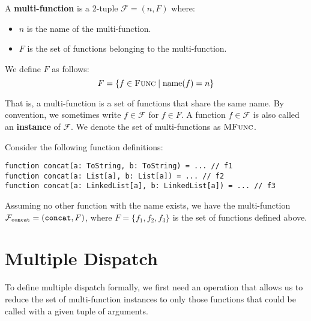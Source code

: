 \noindent A \textbf{multi-function} is a 2-tuple $\mathcal{F} = (n, F)$ where:
\begin{itemize}
	\item $n$ is the name of the multi-function.
	\item $F$ is the set of functions belonging to the multi-function.
\end{itemize}

\noindent We define $F$ as follows:
\begin{equation*}
	F = \{ f \in \textsc{Func} \mid \operatorname{name}(f) = n \}
\end{equation*}

\noindent That is, a multi-function is a set of functions that share the same name. By convention, we sometimes write $f \in \mathcal{F}$ for $f \in F$. A function $f \in \mathcal{F}$ is also called an \textbf{instance} of $\mathcal{F}$. We denote the set of multi-functions as $\textsc{MFunc}$.

\begin{example}
	Consider the following function definitions:
	\begin{lstlisting}
function concat(a: ToString, b: ToString) = ... // f1
function concat(a: List[a], b: List[a]) = ... // f2
function concat(a: LinkedList[a], b: LinkedList[a]) = ... // f3
	\end{lstlisting}
	
	\noindent Assuming no other function with the name  exists, we have the multi-function $\mathcal{F}_{\text{\texttt{concat}}} = (\text{\texttt{concat}}, F)$, where $F = \{ f_1, f_2, f_3 \}$ is the set of  functions defined above.
\end{example}



\section{Multiple Dispatch}

To define multiple dispatch formally, we first need an operation that allows us to reduce the set of multi-function instances to only those functions that could be called with a given tuple of arguments.



